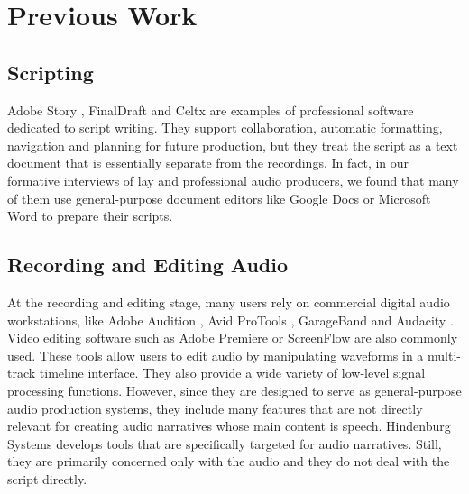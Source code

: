 \section{Previous Work}
\label{sec:voicescript_prevwork}
\subsection{Scripting}
Adobe Story \cite{adobestory2016}, FinalDraft \cite{finaldraft2016} and Celtx \cite{celtx2016} are examples of professional software dedicated to script writing. They support collaboration, automatic formatting, navigation and planning for future production, but they treat the script as a text document that is essentially separate from the recordings. In fact, in our formative interviews of lay and professional audio producers, we found that many of them use general-purpose document editors like Google Docs \cite{googledocs2016} or Microsoft Word \cite{microsoftword2016} to prepare their scripts.

\subsection{Recording and Editing Audio}
At the recording and editing stage, many users rely on commercial digital audio workstations, like Adobe Audition \cite{adobeaudition2016}, Avid ProTools \cite{avidprotools}, GarageBand \cite{garageband} and Audacity \cite{audacity}. Video editing software such as Adobe Premiere \cite{premier} or ScreenFlow \cite{screenflow} are also commonly used. These tools allow users to edit audio by manipulating waveforms in a multi-track timeline interface. They also provide a wide variety of low-level signal processing functions. However, since they are designed to serve as general-purpose audio production systems, they include many features that are not directly relevant for creating audio narratives whose main content is speech. Hindenburg Systems \cite{hindenburg} develops tools that are specifically targeted for audio narratives. Still, they are primarily concerned only with the audio and they do not deal with the script directly.   

